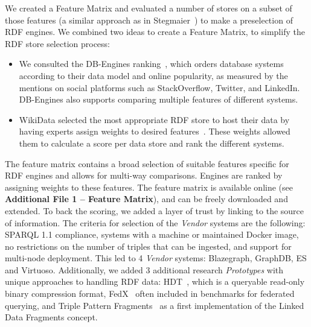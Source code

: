 
We created a Feature Matrix and evaluated a number of stores on a subset of those features (a similar approach as in Stegmaier~\cite{Stegmaier_evaluationof}) to make a preselection of RDF engines.
We combined two ideas to create a Feature Matrix, to simplify the RDF store selection process:
\begin{itemize}
\item We consulted the DB-Engines ranking~\cite{dbengines}, which orders database systems according to their data model and online popularity, as measured by the mentions on social platforms such as StackOverflow, Twitter, and LinkedIn. 
DB-Engines also supports comparing multiple features of different systems.
\item WikiData selected the most appropriate RDF store to host their data by having experts assign weights to desired features~\cite{wikidataranking}.
These weights allowed them to calculate a score per data store and rank the different systems. 
\end{itemize}

The feature matrix contains a broad selection of suitable features specific for RDF engines and allows for multi-way comparisons. Engines are ranked by assigning weights to these features. 
The feature matrix is available online (see \textbf{Additional File 1 -- Feature Matrix}), and can be freely downloaded and extended. To back the scoring, we added a layer of trust by linking to the source of information.
The criteria for selection of the \emph{Vendor} systems are the following:
SPARQL 1.1 compliance, systems with a machine or maintained Docker image, no restrictions on the number of triples that can be ingested, and support for multi-node deployment.
This led to 4 \emph{Vendor} systems: Blazegraph, GraphDB, ES and Virtuoso.
Additionally, we added 3 additional research \emph{Prototypes} with unique approaches to handling RDF data: HDT~\cite{DBLP:journals/ws/FernandezMGPA13}, which is a queryable read-only binary compression format, FedX~\cite{DBLP:conf/semweb/SchwarteHHSS11} often included in benchmarks for federated querying, and Triple Pattern Fragments~\cite{DBLP:conf/semweb/VerborghHMHVSCCMW14} as a first implementation of the Linked Data Fragments concept.


